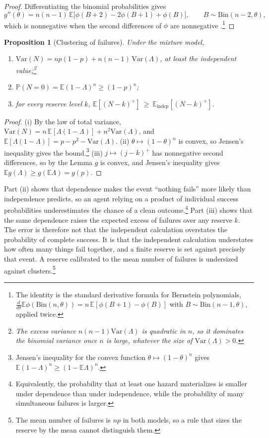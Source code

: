 \documentclass[11pt]{article}
\newtheorem{proposition}{Proposition}
\theoremstyle{remark}
\newcommand{\E}{\mathbb{E}}
\renewcommand{\Pr}{\mathbb{P}}
\begin{document}
\begin{proof}
Differentiating the binomial probabilities gives
\[
g''(\theta)=n(n-1)\,\E\bigl[\phi(B+2)-2\phi(B+1)+\phi(B)\bigr],\qquad B\sim\mathrm{Bin}(n-2,\theta),
\]
which is nonnegative when the second differences of $\phi$ are nonnegative \cite{lorentz}.\footnote{The identity is the standard derivative formula for Bernstein polynomials, $\frac{d}{d\theta}\E\phi(\mathrm{Bin}(n,\theta))=n\,\E[\phi(B+1)-\phi(B)]$ with $B\sim\mathrm{Bin}(n-1,\theta)$, applied twice.}
\end{proof}

\begin{proposition}[Clustering of failures]
Under the mixture model,
\begin{enumerate}[label=(\roman*),nosep]
\item $\mathrm{Var}(N)=np(1-p)+n(n-1)\,\mathrm{Var}(\Lambda)$, at least the independent value;\footnote{The excess variance $n(n-1)\mathrm{Var}(\Lambda)$ is quadratic in $n$, so it dominates the binomial variance once $n$ is large, whatever the size of $\mathrm{Var}(\Lambda)>0$.}
\item $\Pr(N=0)=\E(1-\Lambda)^n\ge(1-p)^n$;
\item for every reserve level $k$, $\E[(N-k)^+]\ \ge\ \E_{\mathrm{indep}}[(N-k)^+]$.
\end{enumerate}
\end{proposition}

\begin{proof}
(i) By the law of total variance, $\mathrm{Var}(N)=n\,\E[\Lambda(1-\Lambda)]+n^2\mathrm{Var}(\Lambda)$, and $\E[\Lambda(1-\Lambda)]=p-p^2-\mathrm{Var}(\Lambda)$. (ii) $\theta\mapsto(1-\theta)^n$ is convex, so Jensen's inequality gives the bound.\footnote{Jensen's inequality for the convex function $\theta\mapsto(1-\theta)^n$ gives $\E(1-\Lambda)^n\ge(1-\E\Lambda)^n$.} (iii) $j\mapsto(j-k)^+$ has nonnegative second differences, so by the Lemma $g$ is convex, and Jensen's inequality gives $\E g(\Lambda)\ge g(\E\Lambda)=g(p)$.
\end{proof}

Part (ii) shows that dependence makes the event ``nothing fails'' more likely than independence predicts, so an agent relying on a product of individual success probabilities underestimates the chance of a clean outcome.\footnote{Equivalently, the probability that at least one hazard materializes is smaller under dependence than under independence, while the probability of many simultaneous failures is larger.} Part (iii) shows that the same dependence raises the expected excess of failures over any reserve $k$. The error is therefore not that the independent calculation overstates the probability of complete success. It is that the independent calculation understates how often many things fail together, and a finite reserve is set against precisely that event. A reserve calibrated to the mean number of failures is undersized against clusters.\footnote{The mean number of failures is $np$ in both models, so a rule that sizes the reserve by the mean cannot distinguish them.}
\end{document}
